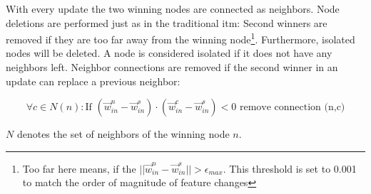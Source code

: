 With every update the two winning nodes are connected as neighbors. Node deletions are performed just as in the traditional \gls{itm}: Second winners are removed if they are too far away from the winning node\footnote{Too far here means, if the $||\vec{w}^n_{in} - \vec{w}^s_{in}|| > \epsilon_{max}$. This threshold is set to 0.001 to match the order of magnitude of feature changes}. Furthermore, isolated nodes will be deleted. A node is considered isolated if it does not have any neighbors left. Neighbor connections are removed if the second winner in an update can replace a previous neighbor:

\begin{equation}
\forall c \in N(n): \text{If~} (\vec{w}^n_{in}-\vec{w}^s_{in}) \cdot (\vec{w}^c_{in}-\vec{w}^s_{in}) < 0 \text{~remove connection (n,c)}
\end{equation}

$N$ denotes the set of neighbors of the winning node $n$.

